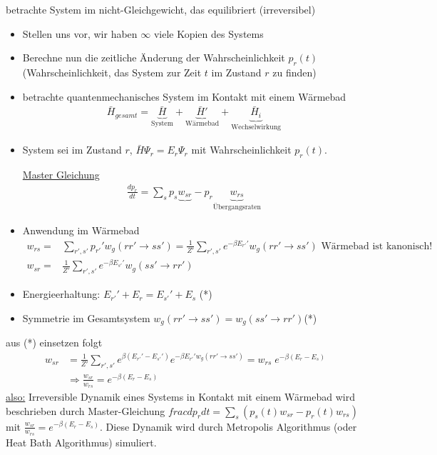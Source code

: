 \documentclass[12pt]{article}
\begin{document}
betrachte System im nicht-Gleichgewicht, das equilibriert (irreversibel) %
\begin{itemize}
\item Stellen uns vor, wir haben $\infty$ viele Kopien des Systems
\item Berechne nun die zeitliche Änderung der Wahrscheinlichkeit $p_r(t)$ (Wahrscheinlichkeit, das System zur Zeit $t$ im Zustand $r$ zu finden)
\item betrachte quantenmechanisches System im Kontakt mit einem Wärmebad
\begin{align}
\bar{H}_{gesamt} = \underbrace{ \bar{H}}_\text{System} + \underbrace{\bar{H}'}_\text{Wärmebad} + \underbrace{ \bar{H}_i}_\text{Wechselwirkung}
\end{align}
\item System sei im Zustand $r$, $\bar{H} \Psi_r = E_r \Psi_r$ mit Wahrscheinlichkeit $p_r(t)$.

\underline{Master Gleichung}
\begin{align}
\frac{dp_r}{dt}= \sum_s p_s \underbrace{w_{sr}}_\text{} - p_r \underbrace{w_{rs}}_\text{Übergangsraten}
\end{align}
\item Anwendung im Wärmebad
\begin{align}
w_{rs}= & \sum_{r',s'} p_{r'}' w_g(rr' \rightarrow ss') = \frac{1}{Z'} \sum_{r',s'}  e^{-\beta E_{r'}'} w_g (rr' \rightarrow ss') \mbox{ Wärmebad ist kanonisch! } \\
w_{sr}= & \frac{1}{Z'} \sum_{r',s'}  e^{-\beta E_{s'}'} w_g (ss' \rightarrow rr')
\end{align}
\item Energieerhaltung: $E_{r'}' + E_r = E_{s'}' + E_s$ (*)
\item Symmetrie im Gesamtsystem $w_g (rr' \rightarrow ss') = w_g (ss' \rightarrow rr')$(*)
\end{itemize}
aus (*) einsetzen folgt
\begin{align}
w_{sr}&= \frac{1}{Z'} \sum_{r',s'} e^{\beta (E_{r'}' -E_{s'}') } e^{-\beta E_{r'}'  w_g (rr' \rightarrow ss')} = w_{rs} \; e^{-\beta (E_r - E_s)} \\
& \Rightarrow  \frac{w_{sr}}{w_{rs}}= e^{-\beta (E_r - E_s)}
\end{align}
\underline{also:} Irreversible Dynamik eines Systems in Kontakt mit einem Wärmebad wird beschrieben durch Master-Gleichung $ frac{dp_r}{dt}= \sum_s( p_s(t) w_{sr} - p_r(t) w_{rs}) $ mit $\frac{w_{sr}}{w_{rs}}= e^{-\beta (E_r-E_s)}$. Diese Dynamik wird durch Metropolis Algorithmus (oder Heat Bath Algorithmus) simuliert.
\end{document}
